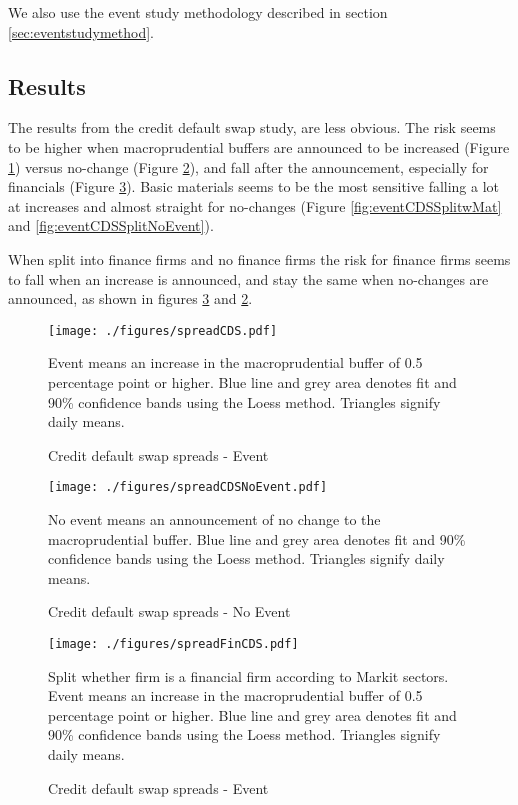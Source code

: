 \documentclass[11pt]{article}
\newcommand\fnote[1]{\captionsetup{font=small}\caption*{#1}}
\begin{document}
We also use the event study methodology described in section \ref{sec:eventstudymethod}.

\subsection{Results}
The results from the credit default swap study, are less obvious. The risk seems to be higher when macroprudential buffers are announced to be increased (Figure \ref{fig:eventCDS}) versus no-change (Figure \ref{fig:eventCDSNoEvent}), and fall after the announcement, especially for financials (Figure \ref{fig:eventCDSFin}). Basic materials seems to be the most sensitive falling a lot at increases and almost straight for no-changes (Figure \ref{fig:eventCDSSplitwMat} and \ref{fig:eventCDSSplitNoEvent}). 

When split into finance firms and no finance firms the risk for finance firms seems to fall when an increase is announced, and stay the same when no-changes are announced, as shown in figures \ref{fig:eventCDSFin} and \ref{fig:eventCDSNoEvent}.



\begin{figure}%
	\centering
	\texttt{[image: ./figures/spreadCDS.pdf]}
	\caption{Credit default swap spreads - Event}
	\label{fig:eventCDS}
	\fnote{Event means an increase in the macroprudential buffer of 0.5 percentage point or higher. Blue line and grey area denotes fit and 90\% confidence bands using the Loess method. Triangles signify daily means.}
\end{figure}

\begin{figure}%
	\centering
	\texttt{[image: ./figures/spreadCDSNoEvent.pdf]}
	\caption{Credit default swap spreads - No Event}
	\label{fig:eventCDSNoEvent}
	\fnote{No event means an announcement of no change to the macroprudential buffer. Blue line and grey area denotes fit and 90\% confidence bands using the Loess method. Triangles signify daily means.}
\end{figure}


\begin{figure}%
	\centering
	\texttt{[image: ./figures/spreadFinCDS.pdf]}
	\caption{Credit default swap spreads - Event}
	\label{fig:eventCDSFin}
	\fnote{Split whether firm is a financial firm according to Markit sectors. Event means an increase in the macroprudential buffer of 0.5 percentage point or higher. Blue line and grey area denotes fit and 90\% confidence bands using the Loess method. Triangles signify daily means.}
\end{figure}
\end{document}
